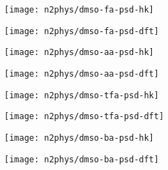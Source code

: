 \begin{figure}[!htb]
    \begin{subfigure}{0.25\linewidth}
        \texttt{[image: n2phys/dmso-fa-psd-hk]}%
        \label{appx:def:fgr:psd-dmso-fa-hk}
    \end{subfigure}%
    \begin{subfigure}{0.25\linewidth}
        \texttt{[image: n2phys/dmso-fa-psd-dft]}%
        \label{appx:def:fgr:psd-dmso-fa-dft}
    \end{subfigure}%
    \begin{subfigure}{0.25\linewidth}
        \texttt{[image: n2phys/dmso-aa-psd-hk]}%
        \label{appx:def:fgr:psd-dmso-aa-hk}
    \end{subfigure}%
    \begin{subfigure}{0.25\linewidth}
        \texttt{[image: n2phys/dmso-aa-psd-dft]}%
        \label{appx:def:fgr:psd-dmso-aa-dft}
    \end{subfigure}%

    \begin{subfigure}{0.25\linewidth}
        \texttt{[image: n2phys/dmso-tfa-psd-hk]}%
        \label{appx:def:fgr:psd-dmso-tfa-hk}
    \end{subfigure}%
    \begin{subfigure}{0.25\linewidth}
        \texttt{[image: n2phys/dmso-tfa-psd-dft]}%
        \label{appx:def:fgr:psd-dmso-tfa-dft}
    \end{subfigure}%
    \begin{subfigure}{0.25\linewidth}
        \texttt{[image: n2phys/dmso-ba-psd-hk]}%
        \label{appx:def:fgr:psd-dmso-ba-hk}
    \end{subfigure}%
    \begin{subfigure}{0.25\linewidth}
        \texttt{[image: n2phys/dmso-ba-psd-dft]}%
        \label{appx:def:fgr:psd-dmso-ba-dft}
    \end{subfigure}%

\end{figure}
